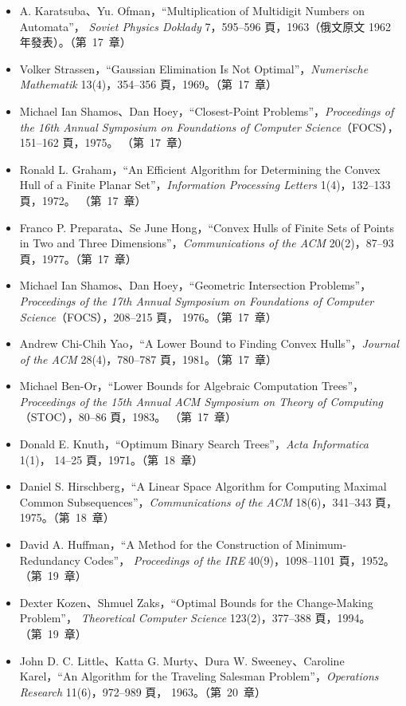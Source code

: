\begin{itemize}
\item A. Karatsuba、Yu. Ofman，``Multiplication of Multidigit Numbers on Automata''，
\textit{Soviet Physics Doklady} 7，595--596 頁，1963（俄文原文 1962 年發表）。（第~17~章）
\item Volker Strassen，``Gaussian Elimination Is Not Optimal''，\textit{Numerische
Mathematik} 13(4)，354--356 頁，1969。（第~17~章）
\item Michael Ian Shamos、Dan Hoey，``Closest-Point Problems''，\textit{Proceedings of the
16th Annual Symposium on Foundations of Computer Science}（FOCS），151--162 頁，1975。
（第~17~章）
\item Ronald L. Graham，``An Efficient Algorithm for Determining the Convex Hull of a
Finite Planar Set''，\textit{Information Processing Letters} 1(4)，132--133 頁，1972。
（第~17~章）
\item Franco P. Preparata、Se June Hong，``Convex Hulls of Finite Sets of Points in Two and
Three Dimensions''，\textit{Communications of the ACM} 20(2)，87--93 頁，1977。（第~17~章）
\item Michael Ian Shamos、Dan Hoey，``Geometric Intersection Problems''，\textit{Proceedings
of the 17th Annual Symposium on Foundations of Computer Science}（FOCS），208--215 頁，
1976。（第~17~章）
\item Andrew Chi-Chih Yao，``A Lower Bound to Finding Convex Hulls''，\textit{Journal of
the ACM} 28(4)，780--787 頁，1981。（第~17~章）
\item Michael Ben-Or，``Lower Bounds for Algebraic Computation Trees''，\textit{Proceedings
of the 15th Annual ACM Symposium on Theory of Computing}（STOC），80--86 頁，1983。
（第~17~章）
\item Donald E. Knuth，``Optimum Binary Search Trees''，\textit{Acta Informatica} 1(1)，
14--25 頁，1971。（第~18~章）
\item Daniel S. Hirschberg，``A Linear Space Algorithm for Computing Maximal Common
Subsequences''，\textit{Communications of the ACM} 18(6)，341--343 頁，1975。（第~18~章）
\item David A. Huffman，``A Method for the Construction of Minimum-Redundancy Codes''，
\textit{Proceedings of the IRE} 40(9)，1098--1101 頁，1952。（第~19~章）
\item Dexter Kozen、Shmuel Zaks，``Optimal Bounds for the Change-Making Problem''，
\textit{Theoretical Computer Science} 123(2)，377--388 頁，1994。（第~19~章）
\item John D. C. Little、Katta G. Murty、Dura W. Sweeney、Caroline Karel，``An Algorithm
for the Traveling Salesman Problem''，\textit{Operations Research} 11(6)，972--989 頁，
1963。（第~20~章）
\end{itemize}

